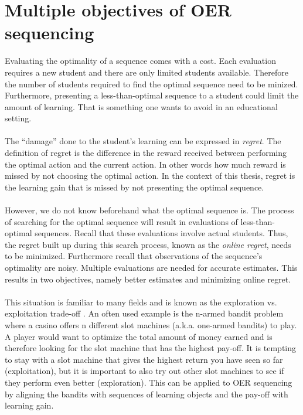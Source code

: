 \section{Multiple objectives of OER sequencing}
Evaluating the optimality of a sequence comes with a cost.
Each evaluation requires a new student and there are only limited
students available. Therefore the number of students required to find the
optimal sequence need to be minized. Furthermore, presenting a
less-than-optimal sequence to a student could limit the amount of learning.
That is something one wants to avoid in an educational setting.\\\\
\noindent
The ``damage'' done to the student's learning can be expressed in
\emph{regret}. The definition of regret is the difference in the reward
received between performing the optimal action and the current action. In other
words how much reward is missed by not choosing the optimal action. In the
context of this thesis, regret is the learning gain that is missed by not
presenting the optimal sequence.\\\\
\noindent
However, we do not know beforehand what the optimal sequence is. The process of
searching for the optimal sequence will result in evaluations of
less-than-optimal sequences. Recall that these evaluations involve actual
students. Thus, the regret built up during this search process, known as the
\emph{online regret}, needs to be minimized. Furthermore recall that
observations of the sequence's optimality are noisy. Multiple evaluations are
needed for accurate estimates. This results in two objectives, namely
better estimates and minimizing online regret.\\\\
\noindent
This situation is familiar to many fields and is known as the exploration vs.
exploitation trade-off \citep{Holland1992}. An often used example is the
n-armed bandit problem \citep{Sutton1998} where a casino offers n different
slot machines (a.k.a. one-armed bandits) to play. A player would want to
optimize the total amount of money earned and is therefore looking for the slot
machine that has the highest pay-off. It is tempting to stay with a slot
machine that gives the highest return you have seen so far (exploitation), but
it is important to also try out other slot machines to see if they perform even
better (exploration). This can be applied to OER sequencing by aligning the
bandits with sequences of learning objects and the pay-off with learning gain.
